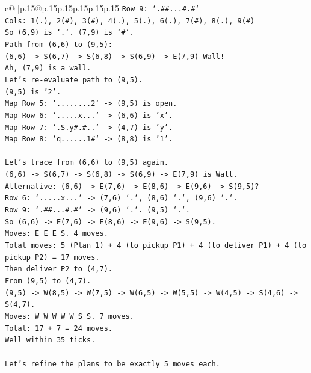 \documentclass{article}
\begin{document}
{\begin{supertabular}{c@{$\;$}|p{.15\linewidth}@{}p{.15\linewidth}p{.15\linewidth}p{.15\linewidth}p{.15\linewidth}p{.15\linewidth}}
{{{\texttt{Row 9: `.\#\#...\#.\#`} \\
\texttt{Cols: 1(.), 2(\#), 3(\#), 4(.), 5(.), 6(.), 7(\#), 8(.), 9(\#)} \\
\texttt{So (6,9) is `.`. (7,9) is `\#`.} \\
\texttt{Path from (6,6) to (9,5):} \\
\texttt{(6,6) {-}> S(6,7) {-}> S(6,8) {-}> S(6,9) {-}> E(7,9) Wall!} \\
\texttt{Ah, (7,9) is a wall.} \\
\texttt{Let's re{-}evaluate path to (9,5).} \\
\texttt{(9,5) is '2'.} \\
\texttt{Map Row 5: `........2` {-}> (9,5) is open.} \\
\texttt{Map Row 6: `.....x...` {-}> (6,6) is 'x'.} \\
\texttt{Map Row 7: `.S.y\#.\#..` {-}> (4,7) is 'y'.} \\
\texttt{Map Row 8: `q......1\#` {-}> (8,8) is '1'.} \\
\\ 
\texttt{Let's trace from (6,6) to (9,5) again.} \\
\texttt{(6,6) {-}> S(6,7) {-}> S(6,8) {-}> S(6,9) {-}> E(7,9) is Wall.} \\
\texttt{Alternative: (6,6) {-}> E(7,6) {-}> E(8,6) {-}> E(9,6) {-}> S(9,5)?} \\
\texttt{Row 6: `.....x...` {-}> (7,6) `.`, (8,6) `.`, (9,6) `.`.} \\
\texttt{Row 9: `.\#\#...\#.\#` {-}> (9,6) `.`. (9,5) `.`.} \\
\texttt{So (6,6) {-}> E(7,6) {-}> E(8,6) {-}> E(9,6) {-}> S(9,5).} \\
\texttt{Moves: E E E S. 4 moves.} \\
\texttt{Total moves: 5 (Plan 1) + 4 (to pickup P1) + 4 (to deliver P1) + 4 (to pickup P2) = 17 moves.} \\
\texttt{Then deliver P2 to (4,7).} \\
\texttt{From (9,5) to (4,7).} \\
\texttt{(9,5) {-}> W(8,5) {-}> W(7,5) {-}> W(6,5) {-}> W(5,5) {-}> W(4,5) {-}> S(4,6) {-}> S(4,7).} \\
\texttt{Moves: W W W W W S S. 7 moves.} \\
\texttt{Total: 17 + 7 = 24 moves.} \\
\texttt{Well within 35 ticks.} \\
\\ 
\texttt{Let's refine the plans to be exactly 5 moves each.} \\
}}}
\end{supertabular}}
\end{document}
